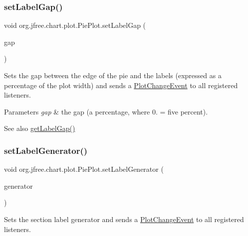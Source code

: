 \subsubsection{\texorpdfstring{set\+Label\+Gap()}{setLabelGap()}}
{\footnotesize\ttfamily void org.\+jfree.\+chart.\+plot.\+Pie\+Plot.\+set\+Label\+Gap (\begin{DoxyParamCaption}\item[{double}]{gap }\end{DoxyParamCaption})}

Sets the gap between the edge of the pie and the labels (expressed as a percentage of the plot width) and sends a \mbox{\hyperlink{}{Plot\+Change\+Event}} to all registered listeners.


\begin{DoxyParams}{Parameters}
{\em gap} & the gap (a percentage, where 0. = five percent).\\
\hline
\end{DoxyParams}
\begin{DoxySeeAlso}{See also}
\mbox{\hyperlink{classorg_1_1jfree_1_1chart_1_1plot_1_1_pie_plot_a7c95a8a80e5f60f48f991a482bf67733}{get\+Label\+Gap()}} 
\end{DoxySeeAlso}
\mbox{\label{classorg_1_1jfree_1_1chart_1_1plot_1_1_pie_plot_accf30f5f996861a0ec3ec133a3577ce3}} 
\subsubsection{\texorpdfstring{set\+Label\+Generator()}{setLabelGenerator()}}
{\footnotesize\ttfamily void org.\+jfree.\+chart.\+plot.\+Pie\+Plot.\+set\+Label\+Generator (\begin{DoxyParamCaption}\item[{\mbox{\hyperlink{interfaceorg_1_1jfree_1_1chart_1_1labels_1_1_pie_section_label_generator}{Pie\+Section\+Label\+Generator}}}]{generator }\end{DoxyParamCaption})}

Sets the section label generator and sends a \mbox{\hyperlink{}{Plot\+Change\+Event}} to all registered listeners.


